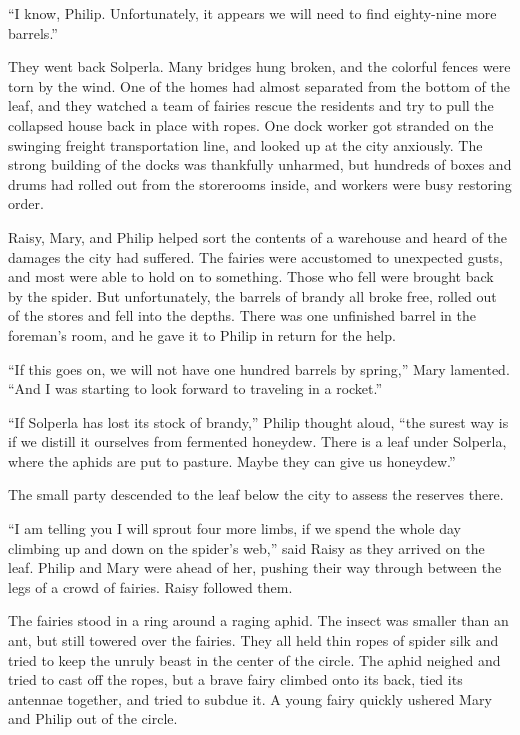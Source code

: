 \documentclass[10pt]{memoir}
\begin{document}
``I know, Philip. Unfortunately, it appears we will need to find eighty-nine
more barrels.''

They went back Solperla. Many bridges hung broken, and the colorful fences were
torn by the wind. One of the homes had almost separated from the bottom of the
leaf, and they watched a team of fairies rescue the residents and try to pull
the collapsed house back in place with ropes. One dock worker got stranded on
the swinging freight transportation line, and looked up at the city anxiously.
The strong building of the docks was thankfully unharmed, but hundreds of boxes
and drums had rolled out from the storerooms inside, and workers were busy
restoring order.

Raisy, Mary, and Philip helped sort the contents of a warehouse and heard of
the damages the city had suffered. The fairies were accustomed to unexpected
gusts, and most were able to hold on to something. Those who fell were brought
back by the spider. But unfortunately, the barrels of brandy all broke free,
rolled out of the stores and fell into the depths. There was one unfinished
barrel in the foreman's room, and he gave it to Philip in return for the help.

``If this goes on, we will not have one hundred barrels by spring,'' Mary
lamented. ``And I was starting to look forward to traveling in a rocket.''

``If Solperla has lost its stock of brandy,'' Philip thought aloud, ``the
surest way is if we distill it ourselves from fermented honeydew. There is a
leaf under Solperla, where the aphids are put to pasture. Maybe they can give
us honeydew.''

The small party descended to the leaf below the city to assess the reserves
there.

``I am telling you I will sprout four more limbs, if we spend the whole day
climbing up and down on the spider's web,'' said Raisy as they arrived on the
leaf. Philip and Mary were ahead of her, pushing their way through between the
legs of a crowd of fairies. Raisy followed them.

The fairies stood in a ring around a raging aphid. The insect was smaller than
an ant, but still towered over the fairies. They all held thin ropes of spider
silk and tried to keep the unruly beast in the center of the circle. The aphid
neighed and tried to cast off the ropes, but a brave fairy climbed onto its
back, tied its antennae together, and tried to subdue it. A young fairy quickly
ushered Mary and Philip out of the circle.
\end{document}
